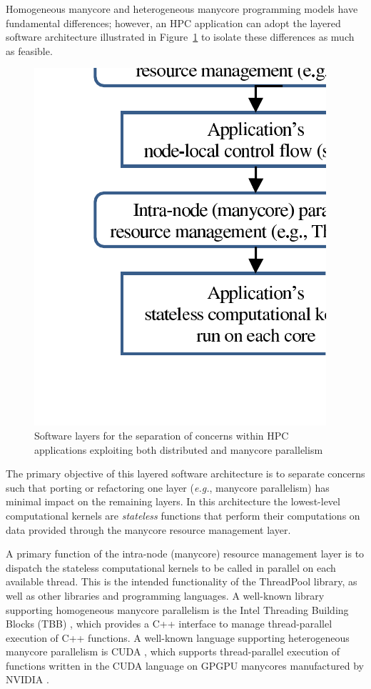 Homogeneous manycore and heterogeneous manycore programming models have fundamental differences; however, an HPC application can adopt the layered software architecture illustrated in Figure~\ref{fig:HybridParallelArchitecture} to isolate these differences as much as feasible.
%
\begin{figure}[h]
\begin{center}
\includegraphics[viewport=0.5in 0.75in 3in 4.5in,angle=0,scale=1]{figures/HybridParallelLayers}
\caption{Software layers for the separation of concerns within HPC applications exploiting both distributed and manycore parallelism}
\label{fig:HybridParallelArchitecture}
\end{center}
\end{figure}
%
The primary objective of this layered software architecture is to separate concerns such that porting or refactoring one layer (\emph{e.g.}, manycore parallelism) has minimal impact on the remaining layers.
%
In this architecture the lowest-level computational kernels are \emph{stateless} functions that perform their computations on data provided through the manycore resource management layer.


A primary function of the intra-node (manycore) resource management layer is to dispatch the stateless computational kernels to be called in parallel on each available thread.
%
This is the intended functionality of the ThreadPool library, as well as other libraries and programming languages.
%
A well-known library supporting homogeneous manycore parallelism is the Intel Threading Building Blocks (TBB) \cite{TBB:Book}, which provides a C++ interface to manage thread-parallel execution of C++ functions.
%
A well-known language supporting heterogeneous manycore parallelism is
CUDA \cite{CUDA:WebSite},
which supports thread-parallel execution of functions written in the CUDA language on GPGPU manycores manufactured by
NVIDIA \cite{NVIDIA:Website}.


